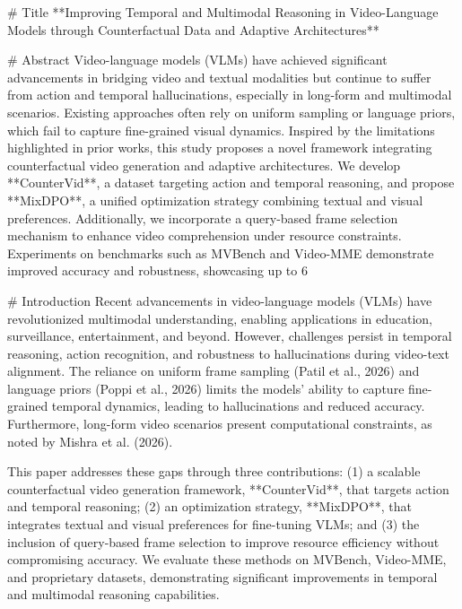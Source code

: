 # Title  
**Improving Temporal and Multimodal Reasoning in Video-Language Models through Counterfactual Data and Adaptive Architectures**

# Abstract  
Video-language models (VLMs) have achieved significant advancements in bridging video and textual modalities but continue to suffer from action and temporal hallucinations, especially in long-form and multimodal scenarios. Existing approaches often rely on uniform sampling or language priors, which fail to capture fine-grained visual dynamics. Inspired by the limitations highlighted in prior works, this study proposes a novel framework integrating counterfactual video generation and adaptive architectures. We develop **CounterVid**, a dataset targeting action and temporal reasoning, and propose **MixDPO**, a unified optimization strategy combining textual and visual preferences. Additionally, we incorporate a query-based frame selection mechanism to enhance video comprehension under resource constraints. Experiments on benchmarks such as MVBench and Video-MME demonstrate improved accuracy and robustness, showcasing up to 6%

# Introduction  
Recent advancements in video-language models (VLMs) have revolutionized multimodal understanding, enabling applications in education, surveillance, entertainment, and beyond. However, challenges persist in temporal reasoning, action recognition, and robustness to hallucinations during video-text alignment. The reliance on uniform frame sampling (Patil et al., 2026) and language priors (Poppi et al., 2026) limits the models' ability to capture fine-grained temporal dynamics, leading to hallucinations and reduced accuracy. Furthermore, long-form video scenarios present computational constraints, as noted by Mishra et al. (2026).  

This paper addresses these gaps through three contributions: (1) a scalable counterfactual video generation framework, **CounterVid**, that targets action and temporal reasoning; (2) an optimization strategy, **MixDPO**, that integrates textual and visual preferences for fine-tuning VLMs; and (3) the inclusion of query-based frame selection to improve resource efficiency without compromising accuracy. We evaluate these methods on MVBench, Video-MME, and proprietary datasets, demonstrating significant improvements in temporal and multimodal reasoning capabilities.

